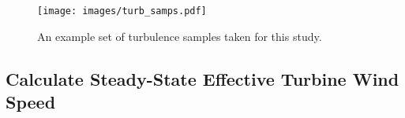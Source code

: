 \documentclass[11pt,letterpaper]{article}
\begin{document}
\begin{figure}
    \centering
    \texttt{[image: images/turb\_samps.pdf]}
    \caption{An example set of turbulence samples taken for this study.}
    \label{turb_samps}
\end{figure}




\subsection{Calculate Steady-State Effective Turbine Wind Speed}
\end{document}
